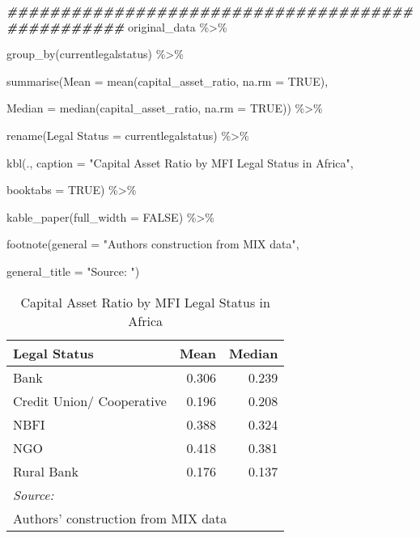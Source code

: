 \documentclass[a4paper,nobind]{templates/ociamthesis}
\newenvironment{Shaded}{\begin{snugshade}}{\end{snugshade}}
\newcommand{\AttributeTok}[1]{\textcolor[rgb]{0.77,0.63,0.00}{#1}}
\newcommand{\ConstantTok}[1]{\textcolor[rgb]{0.00,0.00,0.00}{#1}}
\newcommand{\DocumentationTok}[1]{\textcolor[rgb]{0.56,0.35,0.01}{\textbf{\textit{#1}}}}
\newcommand{\FunctionTok}[1]{\textcolor[rgb]{0.00,0.00,0.00}{#1}}
\newcommand{\NormalTok}[1]{#1}
\newcommand{\OtherTok}[1]{\textcolor[rgb]{0.56,0.35,0.01}{#1}}
\newcommand{\SpecialCharTok}[1]{\textcolor[rgb]{0.00,0.00,0.00}{#1}}
\newcommand{\StringTok}[1]{\textcolor[rgb]{0.31,0.60,0.02}{#1}}
\renewenvironment{Shaded}
{
  \vspace{10pt}%
  \begin{snugshade}%
}{%
  \end{snugshade}%
  \vspace{8pt}%
}
\begin{document}
\begin{Shaded}
\begin{Highlighting}[]
\DocumentationTok{\#\#\#\#\#\#\#\#\#\#\#\#\#\#\#\#\#\#\#\#\#\#\#\#\#\#\#\#\#\#\#\#\#\#\#\#\#\#\#\#\#\#\#\#\#\#\#\#\#}
\NormalTok{original\_data }\SpecialCharTok{\%\textgreater{}\%} 
  
  \FunctionTok{group\_by}\NormalTok{(currentlegalstatus) }\SpecialCharTok{\%\textgreater{}\%} 
  
  \FunctionTok{summarise}\NormalTok{(}\AttributeTok{Mean =} \FunctionTok{mean}\NormalTok{(capital\_asset\_ratio, }\AttributeTok{na.rm =} \ConstantTok{TRUE}\NormalTok{), }
            
            \AttributeTok{Median =} \FunctionTok{median}\NormalTok{(capital\_asset\_ratio, }\AttributeTok{na.rm =} \ConstantTok{TRUE}\NormalTok{)) }\SpecialCharTok{\%\textgreater{}\%} 
  
  \FunctionTok{rename}\NormalTok{(}\StringTok{\textasciigrave{}}\AttributeTok{Legal Status}\StringTok{\textasciigrave{}} \OtherTok{=}\NormalTok{ currentlegalstatus) }\SpecialCharTok{\%\textgreater{}\%} 
  
  \FunctionTok{kbl}\NormalTok{(., }\AttributeTok{caption =} \StringTok{"Capital Asset Ratio by MFI Legal Status in Africa"}\NormalTok{, }
      
      \AttributeTok{booktabs =} \ConstantTok{TRUE}\NormalTok{) }\SpecialCharTok{\%\textgreater{}\%} 
  
  \FunctionTok{kable\_paper}\NormalTok{(}\AttributeTok{full\_width =} \ConstantTok{FALSE}\NormalTok{) }\SpecialCharTok{\%\textgreater{}\%} 
  
  \FunctionTok{footnote}\NormalTok{(}\AttributeTok{general =} \StringTok{"Authors\textquotesingle{} construction from MIX data"}\NormalTok{,}
           
           \AttributeTok{general\_title =} \StringTok{"Source: "}\NormalTok{)}
\end{Highlighting}
\end{Shaded}

\begin{table}

\caption{\label{tab:unnamed-chunk-24}Capital Asset Ratio by MFI Legal Status in Africa}
\centering
\begin{tabular}[t]{lrr}
\toprule
Legal Status & Mean & Median\\
\midrule
Bank & 0.306 & 0.239\\
Credit Union/ Cooperative & 0.196 & 0.208\\
NBFI & 0.388 & 0.324\\
NGO & 0.418 & 0.381\\
Rural Bank & 0.176 & 0.137\\
\bottomrule
\multicolumn{3}{l}{\rule{0pt}{1em}\textit{Source: }}\\
\multicolumn{3}{l}{\rule{0pt}{1em}Authors' construction from MIX data}\\
\end{tabular}
\end{table}
\end{document}
